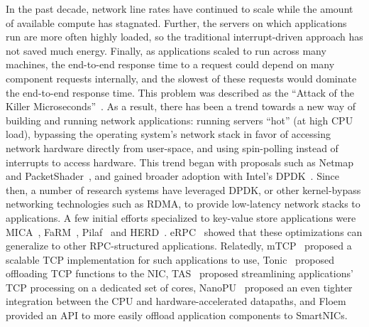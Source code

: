 In the past decade, network line rates have continued to scale while the amount of available compute has stagnated. Further, the servers on which applications run are more often highly loaded, so the traditional interrupt-driven approach has not saved much energy. Finally, as applications scaled to run across many machines, the end-to-end response time to a request could depend on many component requests internally, and the slowest of these requests would dominate the end-to-end response time.
This problem was described as the ``Attack of the Killer Microseconds''~\cite{killer-microseconds}.
As a result, there has been a trend towards a new way of building and running network applications: running servers ``hot'' (\ie at high CPU load), bypassing the operating system's network stack in favor of accessing network hardware directly from user-space, and using spin-polling instead of interrupts to access hardware.
This trend began with proposals such as Netmap~\cite{netmap} and PacketShader~\cite{packetshader}, and gained broader adoption with Intel's DPDK~\cite{dpdk}.
Since then, a number of research systems have leveraged DPDK, or other kernel-bypass networking technologies such as RDMA, to provide low-latency network stacks to applications. A few initial efforts specialized to key-value store applications were MICA~\cite{mica}, FaRM~\cite{farm}, Pilaf~\cite{pilaf} and HERD~\cite{herd}.
eRPC~\cite{erpc} showed that these optimizations can generalize to other RPC-structured applications.
Relatedly, mTCP~\cite{mtcp} proposed a scalable TCP implementation for such applications to use, 
Tonic~\cite{tonic} proposed offloading TCP functions to the NIC,
TAS~\cite{tas} proposed streamlining applications' TCP processing on a dedicated set of cores,
NanoPU~\cite{nanopu} proposed an even tighter integration between the CPU and hardware-accelerated datapaths,
and Floem~\cite{floem} provided an API to more easily offload application components to SmartNICs.

